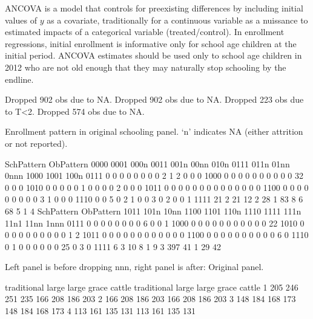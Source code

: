 	ANCOVA is a model that controls for preexisting differences by including initial values of $y$ as a covariate, traditionally for a continuous variable as a nuissance to estimated impacts of a categorical variable (treated/control). In enrollment regressions, initial enrollment is informative only for school age children at the initial period. ANCOVA estimates should be used only to school age children in 2012 who are not old enough that they may naturally stop schooling by the endline.


\begin{Schunk}
\begin{Soutput}
Dropped 902 obs due to NA.
Dropped 902 obs due to NA.
Dropped 223 obs due to T<2.
Dropped 574 obs due to NA.
\end{Soutput}
\end{Schunk}
Enrollment pattern in original schooling panel. `n' indicates NA (either attrition or not reported).
\begin{Schunk}
\begin{Soutput}
         SchPattern
ObPattern 0000 0001 000n 0011 001n 00nn 010n 0111 011n 01nn 0nnn 1000 1001 100n
     0111    0    0    0    0    0    0    0    0    2    1    2    0    0    0
     1000    0    0    0    0    0    0    0    0    0    0   32    0    0    0
     1010    0    0    0    0    0    1    0    0    0    0    2    0    0    0
     1011    0    0    0    0    0    0    0    0    0    0    0    0    0    0
     1100    0    0    0    0    0    0    0    0    0    3    1    0    0    0
     1110    0    0    5    0    2    1    0    0    3    0    2    0    0    1
     1111   21    2   21   12    2   28    1   83    8    6   68    5    1    4
         SchPattern
ObPattern 1011 101n 10nn 1100 1101 110n 1110 1111 111n 11n1 11nn 1nnn
     0111    0    0    0    0    0    0    0    0    6    0    0    1
     1000    0    0    0    0    0    0    0    0    0    0    0   22
     1010    0    0    0    0    0    0    0    0    0    0    1    2
     1011    0    0    0    0    0    0    0    0    0    0    0    0
     1100    0    0    0    0    0    0    0    0    0    0    6    0
     1110    0    1    0    0    0    0    0    0   25    0    3    0
     1111    6    3   10    8    1    9    3  397   41    1   29   42
\end{Soutput}
\end{Schunk}
Left panel is before dropping \textsf{nnn}, right panel is after: Original panel.
\begin{Schunk}
\begin{Soutput}
  traditional large large grace cattle traditional large large grace cattle
1         205   246         251    235         166   208         186    203
2         166   208         186    203         166   208         186    203
3         148   184         168    173         148   184         168    173
4         113   161         135    131         113   161         135    131
\end{Soutput}
\end{Schunk}
